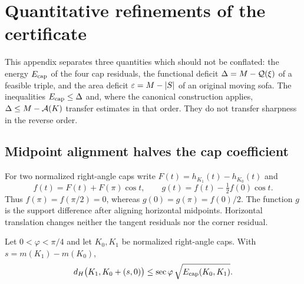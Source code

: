 \section{Quantitative refinements of the certificate}
\label{sec:quant-refinements}

This appendix separates three quantities which should not be conflated:
the energy $E_{\rm cap}$ of the four cap residuals, the functional deficit
$\Delta=M-\mathcal{Q}(\xi)$ of a feasible triple, and the area deficit
$\varepsilon=M-\lvert S\rvert$ of an original moving sofa. The inequalities
$E_{\rm cap}\le\Delta$ and, where the canonical construction applies,
$\Delta\le M-\mathcal{A}(K)$ transfer estimates in that order. They do not transfer
sharpness in the reverse order.


\subsection{Midpoint alignment halves the cap coefficient}
\label{sec:quant-centering}

For two normalized right-angle caps write
$F(t)=h_{K_1}(t)-h_{K_0}(t)$ and
\[
 f(t)=F(t)+F(\pi)\cos t,
 \qquad
 g(t)=f(t)-\tfrac12 f(0)\cos t.
\]
Thus $f(\pi)=f(\pi/2)=0$, whereas
$g(0)=g(\pi)=f(0)/2$. The function $g$ is the support difference after
aligning horizontal midpoints. Horizontal translation changes neither the
tangent residuals nor the corner residual.

\begin{theorem}
\label{thm:quant-centered-energy}
Let $0<\varphi<\pi/4$ and let $K_0,K_1$ be normalized right-angle caps.
With $s=m(K_1)-m(K_0)$,
\[
 d_H\bigl(K_1,K_0+(s,0)\bigr)
 \le \sec\varphi\,\sqrt{E_{\rm cap}(K_0,K_1)}.
\]
\end{theorem}


